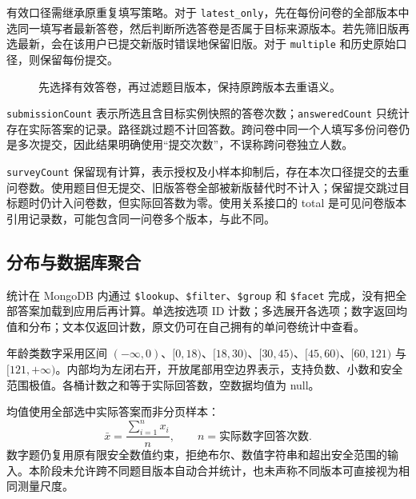 \documentclass[UTF8,10pt,a4paper,twocolumn,fontset=none]{ctexart}
\begin{document}
有效口径需继承原重复填写策略。对于 \texttt{latest\_only}，先在每份问卷的全部版本中选同一填写者最新答卷，然后判断所选答卷是否属于目标来源版本。若先筛旧版再选最新，会在该用户已提交新版时错误地保留旧版。对于 \texttt{multiple} 和历史原始口径，则保留每份提交。

\begin{figure}[t]
\centering
{}
\caption{先选择有效答卷，再过滤题目版本，保持原跨版本去重语义。}
\end{figure}

\texttt{submissionCount} 表示所选且含目标实例快照的答卷次数；\texttt{answeredCount} 只统计存在实际答案的记录。路径跳过题不计回答数。跨问卷中同一个人填写多份问卷仍是多次提交，因此结果明确使用“提交次数”，不误称跨问卷独立人数。

\texttt{surveyCount} 保留现有计算，表示授权及小样本抑制后，存在本次口径提交的去重问卷数。使用题目但无提交、旧版答卷全部被新版替代时不计入；保留提交跳过目标题时仍计入问卷数，但实际回答数为零。使用关系接口的 total 是可见问卷版本引用记录数，可能包含同一问卷多个版本，与此不同。

\subsection{分布与数据库聚合}
统计在 MongoDB 内通过 \texttt{\$lookup}、\texttt{\$filter}、\texttt{\$group} 和 \texttt{\$facet} 完成，没有把全部答案加载到应用后再计算。单选按选项 ID 计数；多选展开各选项；数字返回均值和分布；文本仅返回计数，原文仍可在自己拥有的单问卷统计中查看。

年龄类数字采用区间 $(-\infty,0)$、$[0,18)$、$[18,30)$、$[30,45)$、$[45,60)$、$[60,121)$ 与 $[121,+\infty)$。内部均为左闭右开，开放尾部用空边界表示，支持负数、小数和安全范围极值。各桶计数之和等于实际回答数，空数据均值为 null。

均值使用全部选中实际答案而非分页样本：
\begin{equation}
\bar{x}=\frac{\sum_{i=1}^{n}x_i}{n},\qquad n=\text{实际数字回答次数}.
\end{equation}
数字题仍复用原有限安全数值约束，拒绝布尔、数值字符串和超出安全范围的输入。本阶段未允许跨不同题目版本自动合并统计，也未声称不同版本可直接视为相同测量尺度。
\end{document}
